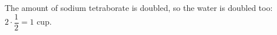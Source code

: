 The amount of sodium tetraborate is doubled, so the water is doubled too: $2\cdot\dfrac12=\boxed{1}$ cup.
